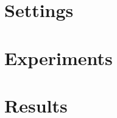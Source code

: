 \documentclass[11pt,titlepage,oneside,openany]{book}
\begin{document}
\section{Settings}
\label{sec:setting}

\section{Experiments}
\label{sec:exp}


\section{Results}
\label{sec:results}


%
%
\end{document}
